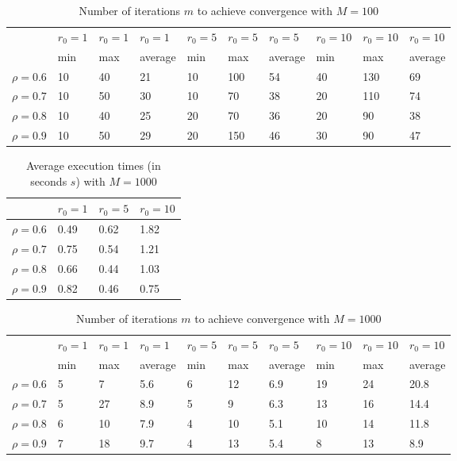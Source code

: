 \documentclass[a4paper,11pt,openright]{report}
\begin{document}
\begin{table}[H]
\centering
\addtolength{\leftskip}{-1.5cm}
\addtolength{\rightskip}{-1.5cm}
\begin{tabular}{|c|lllllllll|}
\hline
$ $ & $r_0 = 1$ & $r_0 = 1$ & $r_0 = 1$ & $r_0 = 5$ & $r_0 = 5$ & $r_0 = 5$ & $r_0 = 10$ & $r_0 = 10$ & $r_0 = 10$  \\
$ $ & min & max & average & min & max & average & min & max & average \\ 
\hline
$\rho = 0.6$ & 10 & 40 & 21 & 10 & 100 & 54 & 40 & 130 & 69 \\

$\rho = 0.7$ & 10 & 50 & 30 & 10 & 70 & 38 & 20 & 110 & 74\\

$\rho = 0.8$ & 10 & 40 & 25 & 20 & 70 & 36 & 20 & 90 & 38\\

$\rho = 0.9$ & 10 & 50 & 29 & 20 & 150 & 46 & 30 & 90 & 47\\
\hline
\end{tabular}
\caption{Number of iterations $m$ to achieve convergence with $M = 100$}
\end{table}
\begin{table}[H]
\centering
\addtolength{\leftskip}{-1.5cm}
\addtolength{\rightskip}{-1.5cm}
\begin{tabular}{|c|lll|}
\hline
$ $ & $r_0 = 1$ & $r_0 = 5$ & $r_0 = 10$ \\
\hline
$\rho = 0.6$ & 0.49 & 0.62 & 1.82 \\

$\rho = 0.7$ & 0.75 & 0.54 & 1.21 \\

$\rho = 0.8$ & 0.66 & 0.44 & 1.03 \\

$\rho = 0.9$ & 0.82 & 0.46 & 0.75 \\
\hline
\end{tabular}
\caption{Average execution
 times (in seconds $s$) with $M = 1000$}
\end{table}
\begin{table}[H]
\centering
\addtolength{\leftskip}{-1.5cm}
\addtolength{\rightskip}{-1.5cm}
\begin{tabular}{|c|lllllllll|}
\hline
$ $ & $r_0 = 1$ & $r_0 = 1$ & $r_0 = 1$ & $r_0 = 5$ & $r_0 = 5$ & $r_0 = 5$ & $r_0 = 10$ & $r_0 = 10$ & $r_0 = 10$  \\
$ $ & min & max & average & min & max & average & min & max & average \\ 
\hline
$\rho = 0.6$ & 5 & 7 & 5.6 & 6 & 12 & 6.9 & 19 & 24 & 20.8 \\

$\rho = 0.7$ & 5 & 27 & 8.9 & 5 & 9 & 6.3 & 13 & 16 & 14.4 \\

$\rho = 0.8$ & 6 & 10 & 7.9 & 4 & 10 & 5.1 & 10 & 14 & 11.8 \\

$\rho = 0.9$ & 7 & 18 & 9.7 & 4 & 13 & 5.4 & 8 & 13 & 8.9\\
\hline
\end{tabular}
\caption{Number of iterations $m$ to achieve convergence with $M = 1000$}
\end{table}
\end{document}
